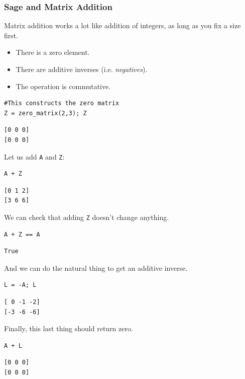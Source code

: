 \documentclass[10pt,]{book}
\theoremstyle{plain}
\numberwithin{equation}{section}
\begin{document}
\subsubsection[Sage and Matrix Addition]{Sage and Matrix Addition}\label{subsubsection-17}
Matrix addition works a lot like addition of integers, as long as you fix
        a size first.%
\begin{itemize}
\item{}There is a zero element.\item{}There are additive inverses (i.e. \emph{negatives}).\item{}The operation is commutative.\end{itemize}
\begin{lstlisting}[style=sageinput]
#This constructs the zero matrix
Z = zero_matrix(2,3); Z
\end{lstlisting}
\begin{lstlisting}[style=sageoutput]
[0 0 0]
[0 0 0]
\end{lstlisting}
\par
Let us add \verb?A? and \verb?Z?:%
\begin{lstlisting}[style=sageinput]
A + Z
\end{lstlisting}
\begin{lstlisting}[style=sageoutput]
[0 1 2]
[3 6 6]
\end{lstlisting}
\par
We can check that adding \verb?Z? doesn't change anything.%
\begin{lstlisting}[style=sageinput]
A + Z == A
\end{lstlisting}
\begin{lstlisting}[style=sageoutput]
True
\end{lstlisting}
\par
And we can do the natural thing to get an additive inverse.%
\begin{lstlisting}[style=sageinput]
L = -A; L
\end{lstlisting}
\begin{lstlisting}[style=sageoutput]
[ 0 -1 -2]
[-3 -6 -6]
\end{lstlisting}
\par
Finally, this last thing should return zero.%
\begin{lstlisting}[style=sageinput]
A + L
\end{lstlisting}
\begin{lstlisting}[style=sageoutput]
[0 0 0]
[0 0 0]
\end{lstlisting}
\typeout{************************************************}
\typeout{************************************************}
\end{document}
